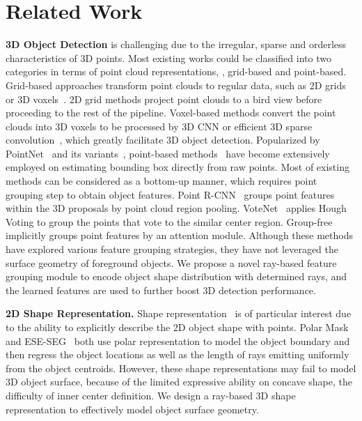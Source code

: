 \documentclass[final]{cvpr}
\begin{document}
\section{Related Work}
\noindent \textbf{3D Object Detection} is challenging due to the irregular, sparse and orderless characteristics of 3D points. Most existing works could be classified into two categories in terms of point cloud representations, \ie, grid-based and point-based. Grid-based approaches transform point clouds to regular data, such as 2D grids~\cite{chen2017multi, zhou2018voxelnet, yang2018pixor} or 3D voxels~\cite{shi2020points,yan2018second,jiang2020pointgroup,shi2020pv,zheng2020cia,zheng2021se,yin2021cvpr,shi2021pv}. 2D grid methods project point clouds to a bird view before proceeding to the rest of the pipeline. Voxel-based methods convert the point clouds into 3D voxels to be processed by 3D CNN or efficient 3D sparse convolution~\cite{graham20183d}, which greatly facilitate 3D object detection. Popularized by PointNet~\cite{qi2017pointnet} and its variants~\cite{qi2018pointnnetplus,jiang2019hierarchical,zhao2019pointweb}, point-based methods~\cite{qi2019deep, zhang2020h3dnet, liu2021group} have become extensively employed on estimating bounding box directly from raw points. Most of existing methods can be considered as a bottom-up manner, which requires point grouping step to obtain object features. Point R-CNN~\cite{shi2019pointrcnn} groups point features within the 3D proposals by point cloud region pooling. VoteNet~\cite{qi2019deep} applies Hough Voting to group the points that vote to the similar center region. Group-free~\cite{liu2021group} implicitly groups point features by an attention module. Although these methods have explored various feature grouping strategies, they have not leveraged the surface geometry of foreground objects. We propose a novel ray-based feature grouping module to encode object shape distribution with determined rays, and the learned features are used to further boost 3D detection performance.

\noindent \textbf{2D Shape Representation.} Shape representation~\cite{xie2020mlcvnet, peng2020deep, xu2019explicit, acuna2018efficient, liang2020polytransform, perreault2021centerpoly} is of particular interest due to the ability to explicitly describe the 2D object shape with points. Polar Mask~\cite{xie2020polarmask} and ESE-SEG~\cite{xu2019explicit} both use polar representation to model the object boundary and then regress the object locations as well as the length of rays emitting uniformly from the object centroids. However, these shape representations may fail to model 3D object surface, because of the limited expressive ability on concave shape, the difficulty of inner center definition. We design a ray-based 3D shape representation to effectively model object surface geometry.
                                                                                     
\end{document}
